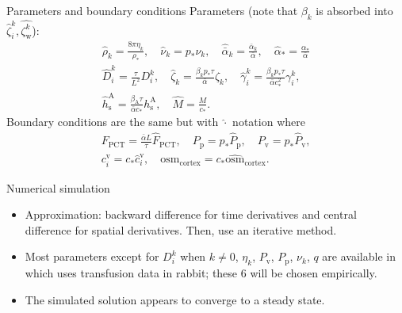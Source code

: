 \documentclass{beamer}
\begin{document}
\begin{frame}{Parameters and boundary conditions}
    Parameters (note that $\beta_k$ is absorbed into $\hat{\zeta}^k_i,\hat{\zeta^k_{\mathrm{w}}}$):
    \begin{gather*}
        \hat{\rho}_{k} = \frac{8\pi\eta_{k}}{\rho_*},\quad 
        \hat{\nu}_k = p_*\nu_k,\quad \hat{\bar{\alpha}}_{k} = \frac{\bar{\alpha}_{k}}{\bar{\alpha}},\quad \hat{\alpha}_* = \frac{\alpha_*}{\bar{\alpha}}\\
        \hat{D}_i^{k} = \frac{\tau}{L^2}D_i^{k},\quad 
        \hat{\zeta}_k = \frac{\beta_k p_*\tau}{\bar{\alpha}}\zeta_k,\quad\hat{\gamma}_i^k = \frac{\beta_kp_*\tau}{\bar{\alpha}c_*^2}\gamma_i^k,\\
        \hat{h}_\mathrm{s}^\mathrm{A} = \frac{\beta_\mathrm{A}\tau}{\bar{\alpha}c_*}h_\mathrm{s}^\mathrm{A},\quad \hat{M} = \frac{M}{c_*}.
    \end{gather*}
    Boundary conditions are the same but with $\hat{\cdot}$ notation where
    \begin{gather*}
        F_\mathrm{PCT} = \frac{\bar{\alpha}L}{\tau}\hat{F}_\mathrm{PCT},\quad
        P_\mathrm{p} = p_*\hat{P}_\mathrm{p},\quad
        P_\mathrm{v} = p_*\hat{P}_\mathrm{v},\\
        c_i^\mathrm{v} = c_*\hat{c}_i^\mathrm{v},\quad \mathrm{osm}_\mathrm{cortex} = c_*\widehat{\mathrm{osm}}_\mathrm{cortex}.
    \end{gather*}

\end{frame}

\begin{frame}{Numerical simulation}
    \begin{itemize}
        \item Approximation: backward difference for time derivatives and central difference for spatial derivatives. Then, use an iterative method.
        \item Most parameters except for $D_i^k$ when $k\neq 0$, $\eta_k$, $P_\mathrm{v}$, $P_\mathrm{p}$, $\nu_k$, $q$ are available in \cite{Stephenson1987,Stephenson1989} which uses transfusion data in rabbit; these 6 will be chosen empirically.
        \item The simulated solution appears to converge to a steady state.
    \end{itemize}
\end{frame}
\end{document}
